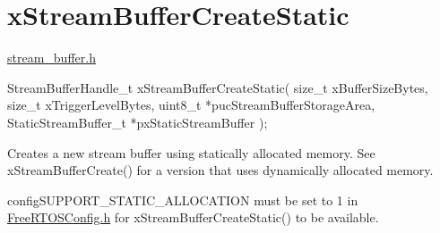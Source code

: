 \hypertarget{group__x_stream_buffer_create_static}{}\section{x\+Stream\+Buffer\+Create\+Static}
\label{group__x_stream_buffer_create_static}
\mbox{\hyperlink{stream__buffer_8h_source}{stream\+\_\+buffer.\+h}}


\begin{DoxyPre}
StreamBufferHandle\_t xStreamBufferCreateStatic( size\_t xBufferSizeBytes,
                                                size\_t xTriggerLevelBytes,
                                                uint8\_t *pucStreamBufferStorageArea,
                                                StaticStreamBuffer\_t *pxStaticStreamBuffer );
\end{DoxyPre}
 Creates a new stream buffer using statically allocated memory. See x\+Stream\+Buffer\+Create() for a version that uses dynamically allocated memory.

config\+S\+U\+P\+P\+O\+R\+T\+\_\+\+S\+T\+A\+T\+I\+C\+\_\+\+A\+L\+L\+O\+C\+A\+T\+I\+ON must be set to 1 in \mbox{\hyperlink{_free_r_t_o_s_config_8h_source}{Free\+R\+T\+O\+S\+Config.\+h}} for x\+Stream\+Buffer\+Create\+Static() to be available.


